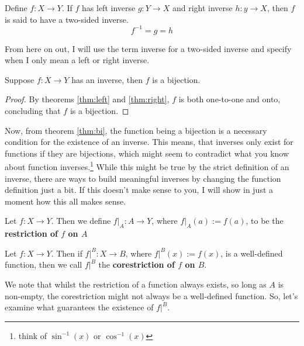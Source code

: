 \begin{define}
	Define $f:X\to Y$. If $f$ has left inverse $g: Y\to X$ and right inverse $h:y\to X$, then $f$ is said to have a two-sided inverse.
	$$f^{-1}=g=h$$
\end{define}
From here on out, I will use the term inverse for a two-sided inverse and specify when I only mean a left or right inverse.
\begin{theorem}
\label{thm:bi}
Suppose $f: X\to Y$ has an inverse, then $f$ is a bijection.\footnotemark
\end{theorem}
\begin{proof}
	By theorems \eqref{thm:left} and \eqref{thm:right}, $f$ is both one-to-one and onto, concluding that $f$ is a bijection.
\end{proof}

Now, from theorem \eqref{thm:bi}, the function being a bijection is a necessary condition for the existence of an inverse. 
This means, that inverses only exist for functions if they are bijections, which might seem to contradict what you know about function inverses.\footnote{think of $\sin^{-1}(x)$ or $\cos^{-1}(x)$}
While this might be true by the strict definition of an inverse, there are ways to build meaningful inverses by changing the function definition just a bit. 
If this doesn't make sense to you, I will show in just a moment how this all makes sense.

\begin{define}
	Let $f:X\to Y$. Then we define $f| _A: A\to Y$, where
	$f|_A(a):=f(a)$, to be the \textbf{restriction of $f$ on $A$}
\end{define}
\begin{define}
	Let $f:X\to Y$. Then if $f|^B:X\to B$, where $f|^B(x):=f(x)$, is a well-defined function, then we call $f|^B$ the \textbf{corestriction of $f$ on $B$}.
\end{define}

We note that whilst the restriction of a function always exists, so long as $A$ is non-empty, the corestriction might not always be a well-defined function.
So, let's examine what guarantees the existence of $f|^B$.

